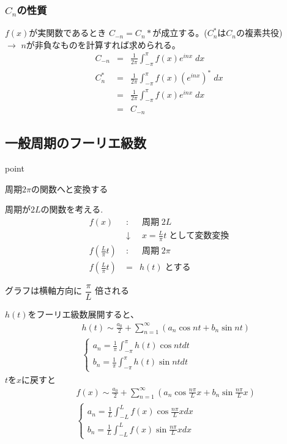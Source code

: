 \documentclass[a4paper]{jsarticle}
\begin{document}
\subsubsection*{$C_n$の性質}
$f\left(x\right)$が実関数であるとき $C_{-n}=C_n*$が成立する。($C_n^*$は$C_n$の複素共役)\\
$\rightarrow$ $n$が非負なものを計算すれば求められる。
\begin{eqnarray*}
    C_{-n} &=& \frac{1}{2\pi} \int^{\pi}_{-\pi} f\left(x\right) e^{inx} \;dx\\
    C_{n}^* &=& \frac{1}{2\pi} \int^{\pi}_{-\pi} f\left(x\right) \left(e^{inx}\right)^* \;dx\\
    &=& \frac{1}{2\pi} \int^{\pi}_{-\pi} f\left(x\right) e^{inx} \;dx\\
    &=& C_{-n}
\end{eqnarray*}

\subsection{一般周期のフーリエ級数}
\begin{itembox}[l]{point}
    \begin{center}
        周期$2\pi$の関数へと変換する
    \end{center}
\end{itembox}
周期が$2L$の関数を考える.
\begin{eqnarray*}
    f\left(x\right) \;&:&\; 周期 \; 2L\\
    &\downarrow& \; x = \frac{L}{\pi} t \; として変数変換\\
    f\left(\frac{L}{\pi} t\right) \;&:&\; 周期 \; 2\pi\\
    f\left(\frac{L}{\pi} t\right) &=& h\left(t\right) \; とする
\end{eqnarray*}
\begin{center}
    グラフは横軸方向に $\dfrac{\pi}{L}$ 倍される
\end{center}

$h\left(t\right)$をフーリエ級数展開すると、
\begin{eqnarray*}
    &&h\left(t\right) \sim \frac{a_0}{2}+\sum^{\infty}_{n=1}\left(a_n \cos nt + b_n \sin nt\right)\\
    &&\begin{cases}
        a_n=\displaystyle\frac{1}{\pi}\int^{\pi}_{-\pi}h\left(t\right)\cos nt dt\\
        b_n=\displaystyle\frac{1}{\pi}\int^{\pi}_{-\pi}h\left(t\right)\sin nt dt
    \end{cases}
\end{eqnarray*}
$t$を$x$に戻すと
\begin{eqnarray*}
    &&f\left(x\right) \sim \frac{a_0}{2}+\sum^{\infty}_{n=1}\left(a_n \cos \frac{n\pi}{L}x + b_n \sin \frac{n\pi}{L}x\right)\\
    &&\begin{cases}
        a_n=\displaystyle\frac{1}{L}\int^{L}_{-L}f\left(x\right)\cos \frac{n\pi}{L}x dx\\
        b_n=\displaystyle\frac{1}{L}\int^{L}_{-L}f\left(x\right)\sin \frac{n\pi}{L}x dx
    \end{cases}
\end{eqnarray*}
\end{document}

